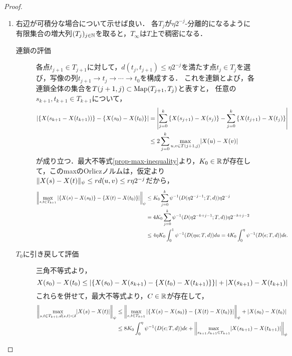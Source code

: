 \documentclass[uplatex,dvipdfmx]{jsreport}
\begin{document}
\begin{proof}\mbox{}
    \begin{enumerate}
        \item 右辺が可積分な場合について示せば良い．
        各$T_j$が$\eta 2^{-j}$-分離的になるように有限集合の増大列$(T_j)_{j\in\mathbb{N}}$を取ると，$T_\infty$は$T$上で稠密になる．
        \begin{description}
            \item[連鎖の評価] 
            各点$t_{j+1}\in T_{j+1}$に対して，$d(t_j,t_{j+1})\le\eta 2^{-j}$を満たす点$t_j\in T_j$を選び，写像の列$t_{j+1}\to t_j\to\cdots\to t_0$を構成する．
            これを連鎖とよび，各連鎖全体の集合を$T(j+1,j)\subset\mathrm{Map}(T_{j+1},T_j)$と表すと，
            任意の$s_{k+1},t_{k+1}\in T_{k+1}$について，
            \begin{align*}
                \lvert\left\{X(s_{k+1}-X(t_{k+1}))\right\}-\left\{X(s_0)-X(t_0)\right\}\rvert&=\left|\sum^k_{j=0}\left\{X(s_{j+1})-X(s_{j})\right\}-\sum^k_{j=0}\left\{X(t_{j+1})-X(t_{j})\right\}\right|\\
                &\le 2\sum^k_{j=0}\max_{u,v\in T(j+1,j)}\lvert X(u)-X(v)\rvert
            \end{align*}
            が成り立つ．最大不等式\ref{prop-max-inequality}より，$K_0\in\mathbb{R}$が存在して，このmaxのOrliczノルムは，仮定より$\|X(s)-X(t)\|_\psi\le rd(u,v)\le r\eta 2^{-j}$だから，
            \begin{align*}
                \left\|\max_{s,t\in T_{k+1}}\left|\left\{X(s)-X(s_0)\right\}-\left\{X(t)-X(t_0)\right\}\right|\right\|_\psi&\le K_0\sum^k_{j=0}\psi^{-1}(D(\eta 2^{-j-1};T,d))\eta 2^{-j}\\
                &=4K_0\sum^k_{j=0}\psi^{-1}(D(\eta 2^{-k+j-1};T,d))\eta 2^{-k+j-2}\\
                &\le 4\eta K_0\int^1_0\psi^{-1}(D(\eta u;T,d))du=4K_0\int^\eta_0\psi^{-1}(D(\epsilon;T,d))d\epsilon.
            \end{align*}
            \item[$T_0$に引き戻して評価]
            三角不等式より，
            \[X(s_0)-X(t_0)\le\lvert\left\{X(s_0)-X(s_{k+1})-\left\{X(t_0)-X(t_{k+1})\right\}\right\}\rvert+\lvert X(s_{k+1})-X(t_{k+1})\rvert\]
            これらを併せて，最大不等式より，$C\in\mathbb{R}$が存在して，
            \begin{align*}
                \Norm{\max_{s,t\in T_{k+1},d(s,t)<\delta}\abs{X(s)-X(t)}}_\psi&\le\Norm{\max_{s,t\in T_{k+1}}\Abs{\Brace{X(s)-X(s_0)}-\Brace{X(t)-X(t_0)}}}_\psi+\abs{X(s_0)-X(t_0)}\\
                &\le 8K_0\int^\eta_0\psi^{-1}(D(\ep;T,d))d\ep+\Norm{\max_{s_{k+1},t_{k+1}\in T_{k+1}}\abs{X(s_{k+1})-X(t_{k+1})}}_\psi\\

\end{align*}
\end{description}
\end{enumerate}
\end{proof}
\end{document}
